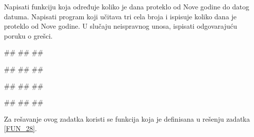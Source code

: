 \begin{Exercise}[label=FUN_26] 
Napisati funkciju  koja određuje koliko je dana proteklo od Nove godine do
datog datuma. Napisati program koji učitava tri cela broja i ispisuje
koliko dana je proteklo od Nove godine. 
U slučaju neispravnog unosa, ispisati odgovarajuću poruku o grešci. 

\begin{miditest}
\begin{upotreba}{1}
#\naslovInt#
##
##
\end{upotreba}
\end{miditest}
\begin{miditest}
\begin{upotreba}{2}
#\naslovInt#
##
##
\end{upotreba}
\end{miditest}

\begin{miditest}
\begin{upotreba}{3}
#\naslovInt#
##
##
\end{upotreba}
\end{miditest}
\begin{miditest}
\begin{upotreba}{4}
#\naslovInt#
##
##
\end{upotreba}
\end{miditest}

\end{Exercise}
\ifresenja 
\begin{Answer}[ref=FUN_26]

Za rešavanje ovog zadatka koristi se funkcija  koja je definisana u rešenju zadatka \ref{FUN_28}.
\end{Answer} 
\fi


